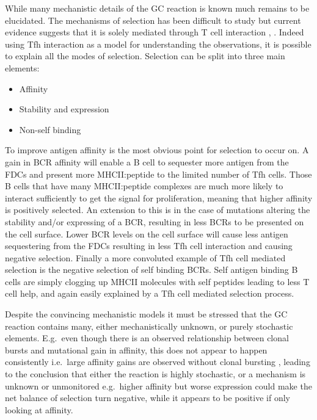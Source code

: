 While many mechanistic details of the GC reaction is known much remains to be elucidated.
The mechanisms of selection has been difficult to study but current evidence suggests that it is solely mediated through T cell interaction \cite{victora2012germinal}, \cite{victora2014clonal}.
Indeed using Tfh interaction as a model for understanding the observations, it is possible to explain all the modes of selection.
Selection can be split into three main elements:
\begin{itemize}
  \item Affinity
  \item Stability and expression
  \item Non-self binding
\end{itemize}

To improve antigen affinity is the most obvious point for selection to occur on.
A gain in BCR affinity will enable a B cell to sequester more antigen from the FDCs and present more MHCII:peptide to the limited number of Tfh cells.
Those B cells that have many MHCII:peptide complexes are much more likely to interact sufficiently to get the signal for proliferation, meaning that higher affinity is positively selected.
An extension to this is in the case of mutations altering the stability and/or expressing of a BCR, resulting in less BCRs to be presented on the cell surface.
Lower BCR levels on the cell surface will cause less antigen sequestering from the FDCs resulting in less Tfh cell interaction and causing negative selection.
Finally a more convoluted example of Tfh cell mediated selection is the negative selection of self binding BCRs.
Self antigen binding B cells are simply clogging up MHCII molecules with self peptides leading to less T cell help, and again easily explained by a Tfh cell mediated selection process.

Despite the convincing mechanistic models it must be stressed that the GC reaction contains many, either mechanistically unknown, or purely stochastic elements.
E.g.\ even though there is an observed relationship between clonal bursts and mutational gain in affinity, this does not appear to happen consistently i.e.\ large affinity gains are observed without clonal bursting \cite{tas2016visualizing}, leading to the conclusion that either the reaction is highly stochastic, or a mechanism is unknown or unmonitored e.g.\ higher affinity but worse expression could make the net balance of selection turn negative, while it appears to be positive if only looking at affinity.

